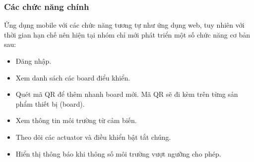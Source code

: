 \documentclass[a4paper,12pt,oneside]{article}
\begin{document}
\subsubsection{Các chức năng chính}
Ứng dụng mobile với các chức năng tương tự như ứng dụng web, tuy nhiên với thời gian hạn chế nên hiện tại nhóm chỉ mới phát triển một số chức năng cơ bản sau:
	\begin{itemize}
		\item Đăng nhập.
		\item Xem danh sách các board điểu khiển.
		\item Quét mã QR để thêm nhanh board mới. Mã QR sẽ đi kèm trên từng sản phẩm thiết bị (board).
		\item Xem thông tin môi trường từ cảm biến.
		\item Theo dõi các actuator và điều khiển bật tắt chúng.
		\item Hiển thị thông báo khi thông số môi trường vượt ngưỡng cho phép.
	\end{itemize}

\newpage
\end{document}
